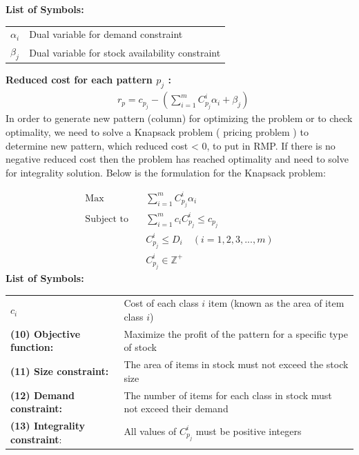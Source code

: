 \documentclass[a4paper]{article}
\begin{document}
\textbf{List of Symbols:}
\begin{table}[H]
    \centering
    \renewcommand{\arraystretch}{1.5} %
    \setlength{\tabcolsep}{66pt} %
    \begin{tabularx}{1.2\textwidth}{l X} %
        \textbf{$\alpha_i$} & Dual variable for demand constraint \\
        \textbf{$\beta_j$} & Dual variable for stock availability constraint \\
    \end{tabularx}
    \label{tab:list_of_symbols}
\end{table}


\textbf{Reduced cost for each pattern \(p_j\) : }
\begin{align}
& r_p = c_{p_j} - \left( \sum_{i=1}^{m} C_{p_j}^i \alpha_i + \beta_j \right)
\end{align}
In order to generate new pattern (column) for optimizing the problem or to check optimality, we need to solve a Knapsack problem ( pricing problem ) to determine new pattern, which reduced cost < 0, to put in RMP. If there is no negative reduced cost then the problem has reached optimality and need to solve for integrality solution. Below is the formulation for the Knapsack problem:

\begin{align}
\text{Max} \quad & \sum_{i=1}^{m} C_{p_j}^i \alpha_i \\
\text{Subject to} \quad & \sum_{i=1}^{m} c_i C_{p_j}^i \le c_{p_j} \\
& C_{p_j}^i \le D_i  \quad (i = 1, 2, 3, ..., m) \\
& C_{p_j}^i \in \mathbb{Z}^+
\end{align}
\textbf{List of Symbols:}
\begin{center}
\begin{tabularx}{0.85\textwidth}{l X}
    \textbf{$c_i$} & Cost of each class \(i\) item (known as the area of item class \(i\)) \\
    \addlinespace[0.2em]
    \textbf{(10) Objective function:} & Maximize the profit of the pattern for a specific type of stock \\
    \addlinespace[0.2em]
    \textbf{(11) Size constraint:} & The area of items in stock must not exceed the stock size \\
    \addlinespace[0.2em]
    \textbf{(12) Demand constraint:} & The number of items for each class in stock must not exceed their demand \\
    \addlinespace[0.2em]
    \textbf{(13) Integrality constraint}: & All values of \(C_{p_j}^i\) must be positive integers \\
\end{tabularx}
\end{center}
\end{document}
